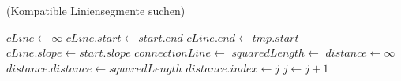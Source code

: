 \begin{algorithm}[!ht]
\caption{ (Kompatible Liniensegmente suchen)}
\label{alg:mergelines3}
\begin{algorithmic}[1]
			\State $\mathit{cLine} \gets \infty$
			\State $\mathit{cLine.start} \gets \mathit{start.end}$
			\State $\mathit{cLine.end} \gets \mathit{tmp.start}$
			\State $\mathit{cLine.slope} \gets \mathit{start.slope}$
				\State $\mathit{connectionLine} \gets$ 
				\State $\mathit{squaredLength} \gets$ 
				\State $\mathit{distance} \gets \infty$
				\State $\mathit{distance.distance} \gets \mathit{squaredLength}$
				\State $\mathit{distance.index} \gets j$
				\State {}
			\EndIf
		\EndIf
		\State $j \gets j + 1$
	\EndFor
\end{algorithmic}
\end{algorithm}
